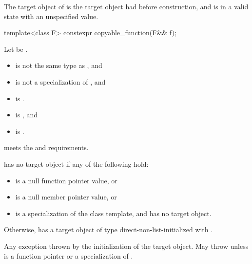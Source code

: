 \begin{itemdescr}
\pnum
\ensures
The target object of  is the target object  had before construction, and  is in a valid state with an unspecified value.
\end{itemdescr}

%
\begin{itemdecl}
template<class F>
  constexpr copyable_function(F&& f);
\end{itemdecl}

\begin{itemdescr}
\pnum
Let  be .

\pnum
\constraints
\begin{itemize}
\item {} is not the same type as , and
\item {} is not a specialization of , and
\item {} is .
\end{itemize}

\pnum
\mandates
\begin{itemize}
\item {} is , and
\item {} is .
\end{itemize}

\pnum
\expects
{} meets the  and  requirements.

\pnum
\ensures
{} has no target object if any of the following hold:
\begin{itemize}
\item {} is a null function pointer value, or
\item {} is a null member pointer value, or
\item {} is a specialization of the  class template, and  has no target object.
\end{itemize}
Otherwise,  has a target object of type  direct-non-list-initialized with .

\pnum
\throws
Any exception thrown by the initialization of the target object. May throw  unless  is a function pointer or a specialization of .
\end{itemdescr}


